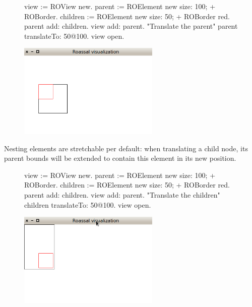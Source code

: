 \documentclass[a4paper,10pt,twoside]{book}
\begin{document}
\begin{figure}[H]
      \begin{minipage}[t]{0.5\textwidth}
      \vspace{0pt}
\begin{code}{}
view := ROView new.
parent := ROElement new 
				size: 100;
				+ ROBorder.
children := ROElement new 
				size: 50;
				+ ROBorder red.
parent add: children.
view add: parent.
"Translate the parent"
parent translateTo: 50@100.
view open.
\end{code}
   \end{minipage}
   \hfill
   \begin{minipage}[t]{0.6\textwidth}
      \vspace{0pt} \raggedright
       \centering
		\includegraphics[width=0.6\textwidth]{ex5}
   \end{minipage}
\label{fig:ex5}
\end{figure}

Nesting elements are stretchable per default: when translating a child node, its parent bounds will be extended to contain this element in its new position. 

\begin{figure}[H]
      \begin{minipage}[t]{0.5\textwidth}
      \vspace{0pt}
\begin{code}{}
view := ROView new.
parent := ROElement new 
				size: 100;
				+ ROBorder.
children := ROElement new 
				size: 50;
				+ ROBorder red.
parent add: children.
view add: parent.
"Translate the children"
children translateTo: 50@100.
view open.
\end{code}
   \end{minipage}
   \hfill
   \begin{minipage}[t]{0.6\textwidth}
      \vspace{0pt} \raggedright
       \centering
		\includegraphics[width=0.6\textwidth]{ex6}
   \end{minipage}
\label{fig:ex6}
\end{figure}
\end{document}
